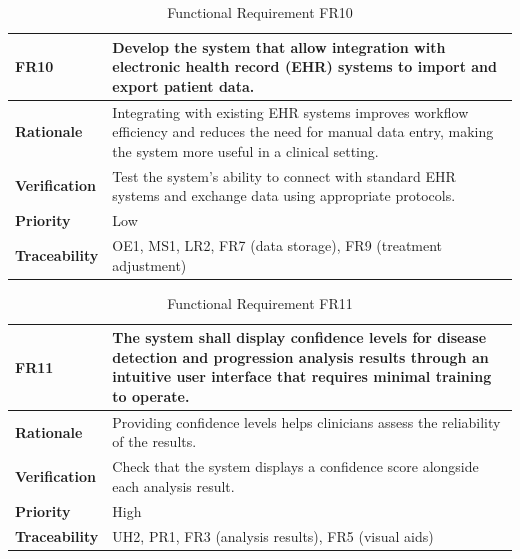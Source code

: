 \documentclass[12pt]{article}
\begin{document}
\begin{table}[h!]
\centering
{}
\begin{tabular}{|p{3.5cm}|p{11.5cm}|}
\hline
\rowcolor{gray!30}
\textbf{FR10} & Develop the system that allow integration with electronic health record (EHR) systems to import and export patient data. \\
\hline
\textbf{Rationale} & Integrating with existing EHR systems improves workflow efficiency and reduces the need for manual data entry, making the system more useful in a clinical setting. \\
\hline
\textbf{Verification} & Test the system’s ability to connect with standard EHR systems and exchange data using appropriate protocols. \\
\hline
\textbf{Priority} & Low \\
\hline
\textbf{Traceability} & OE1, MS1, LR2, FR7 (data storage), FR9 (treatment adjustment) \\
\hline
\end{tabular}
\caption{Functional Requirement FR10}
\end{table}
\begin{table}[h!]
\centering
{}
\begin{tabular}{|p{3.5cm}|p{11.5cm}|}
\hline
\rowcolor{gray!30}
\textbf{FR11} & The system shall display confidence levels for disease detection and progression analysis results through an intuitive user interface that requires minimal training to operate. \\
\hline
\textbf{Rationale} & Providing confidence levels helps clinicians assess the reliability of the results. \\
\hline
\textbf{Verification} & Check that the system displays a confidence score alongside each analysis result. \\
\hline
\textbf{Priority} & High \\
\hline
\textbf{Traceability} & UH2, PR1, FR3 (analysis results), FR5 (visual aids) \\
\hline
\end{tabular}
\caption{Functional Requirement FR11}
\end{table}
\end{document}

